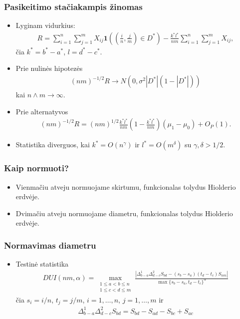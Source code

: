 \documentclass[utf8,hyperref={unicode}]{beamer}
\theoremstyle{change}\newtheorem{teorema}{Teiginys}
\theoremstyle{change}\newtheorem{salyga}{}
\newcommand{\indf}[1]{\mathbf{1}\left( #1 \right)}
\begin{document}
\begin{frame}
    \frametitle{Pasikeitimo stačiakampis žinomas} 
    \begin{itemize}
	\item Lyginam vidurkius: 
	\begin{align*}
	R=\sum_{i=1}^n\sum_{j=1}^mX_{ij}
    \indf{\left(\frac{i}{n},\frac{j}{m}\right)\in D^*}-
    \frac{k^*l^*}{nm}\sum_{i=1}^n\sum_{j=1}^mX_{ij},
\end{align*}
    čia $k^*=b^*-a^*$, $l=d^*-c^*$.
\item Prie nulinės hipotezės  	
    \begin{align*}
    (nm)^{-1/2}R\to N(0,\sigma^2|D^*|(1-|D^*|))
\end{align*}
kai $n\wedge m\to\infty$. 
 \item Prie alternatyvos  
    \begin{align*}
    (nm)^{-1/2}R=(nm)^{1/2}\frac{k^*l^*}{nm}\left(1-\frac{k^*l^*}{nm}
    \right) (\mu_1-\mu_0) +O_P(1).
\end{align*}
   \item  Statistika diverguos, kai  $k^*=O(n^{\gamma})$ ir $l^*=O(m^\delta)$ su  $\gamma,\delta>1/2$.
  \end{itemize}
\end{frame}
\begin{frame}
    \frametitle{Kaip normuoti?} 
    \begin{itemize}
	\item Vienmačiu atveju normuojame skirtumu, funkcionalas tolydus
	    Hiolderio erdvėje.
	\item Dvimačiu atveju normuojame diametru, funkcionalas tolydus
	    Hiolderio erdvėje.
    \end{itemize}
 \end{frame}
 \begin{frame}
     \frametitle{Normavimas diametru} 
   \begin{itemize}
	\item Testinė statistika
	    \begin{align*}
		DUI(nm,\alpha)=\max_{\substack{1\le a<b\le n\\  1\le c< d\le m}} 
    \frac{|\Delta^1_{b-a}\Delta^2_{d-c}S_{bd}-(s_{b}-s_{a})
    (t_{d}-t_{c})S_{nm}|}{\max\{s_{b}-s_{a},t_{d}-t_{c}\}^\alpha}
	    \end{align*}
	čia $s_i=i/n$, $t_j=j/m$,  $i=1,\dots,n$, $j=1,\dots,m$ ir
	\begin{align*}
	    \Delta^1_{b-a}\Delta^2_{d-c}S_{bd}
	    =S_{bd}-S_{ad}-S_{bc}+S_{ac}
	\end{align*}
   \end{itemize}
\end{frame}
\end{document}

